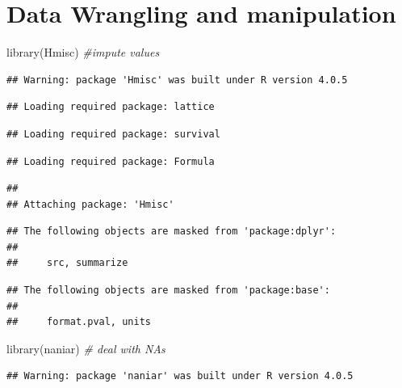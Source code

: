 \documentclass[
]{article}
\newenvironment{Shaded}{\begin{snugshade}}{\end{snugshade}}
\newcommand{\CommentTok}[1]{\textcolor[rgb]{0.56,0.35,0.01}{\textit{#1}}}
\newcommand{\FunctionTok}[1]{\textcolor[rgb]{0.00,0.00,0.00}{#1}}
\newcommand{\NormalTok}[1]{#1}
\begin{document}
\hypertarget{data-wrangling-and-manipulation}{%
\section{Data Wrangling and manipulation}\label{data-wrangling-and-manipulation}}

\begin{Shaded}
\begin{Highlighting}[]
\FunctionTok{library}\NormalTok{(Hmisc) }\CommentTok{\#impute values}
\end{Highlighting}
\end{Shaded}

\begin{verbatim}
## Warning: package 'Hmisc' was built under R version 4.0.5
\end{verbatim}

\begin{verbatim}
## Loading required package: lattice
\end{verbatim}

\begin{verbatim}
## Loading required package: survival
\end{verbatim}

\begin{verbatim}
## Loading required package: Formula
\end{verbatim}

\begin{verbatim}
## 
## Attaching package: 'Hmisc'
\end{verbatim}

\begin{verbatim}
## The following objects are masked from 'package:dplyr':
## 
##     src, summarize
\end{verbatim}

\begin{verbatim}
## The following objects are masked from 'package:base':
## 
##     format.pval, units
\end{verbatim}

\begin{Shaded}
\begin{Highlighting}[]
\FunctionTok{library}\NormalTok{(naniar) }\CommentTok{\# deal with NAs}
\end{Highlighting}
\end{Shaded}

\begin{verbatim}
## Warning: package 'naniar' was built under R version 4.0.5
\end{verbatim}
\end{document}
